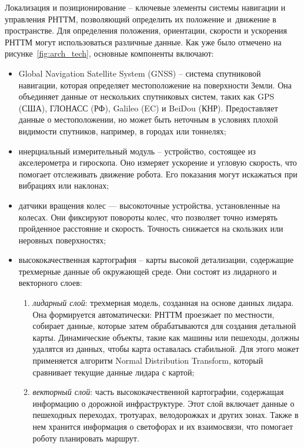 Локализация и позиционирование -- ключевые элементы системы навигации и управления РНТТМ, позволяющий определить их положение и~движение в пространстве. Для определения положения, ориентации, скорости и ускорения РНТТМ могут использоваться различные данные. Как уже было отмечено на рисунке~\cref{fig:arch_tech}, основные компоненты включают:

\begin{itemize}[beginpenalty=10000, midpenalty=10000, wide=\parindent, leftmargin=0pt]
	\item Global Navigation Satellite System (GNSS)	-- система спутниковой навигации, которая определяет местоположение на поверхности Земли. Она объединяет данные от нескольких спутниковых систем, таких как GPS (США), ГЛОНАСС (РФ), Galileo (EC) и BeiDou (КНР). Предоставляет данные о местоположении, но может быть неточным в условиях плохой видимости спутников, например, в городах или тоннелях;


 	\item инерциальный измерительный модуль -- устройство, состоящее из акселерометра и гироскопа. Оно измеряет ускорение и угловую скорость, что помогает отслеживать движение робота. Его показания могут искажаться при вибрациях или наклонах;

	\item датчики вращения колес — высокоточные устройства, установленные на колесах. Они фиксируют повороты колес, что позволяет точно измерять пройденное расстояние и скорость. Точность снижается на скользких или неровных поверхностях;

	\item высококачественная картография -- карты высокой детализации, содержащие трехмерные данные об окружающей среде. Они состоят из лидарного и векторного слоев:

	\begin{enumerate}[beginpenalty=10000, midpenalty=10000, wide=\parindent, leftmargin=0pt]
		\item \textit{лидарный слой}:
		трехмерная модель, созданная на основе данных лидара. Она формируется автоматически: РНТТМ проезжает по местности, собирает данные, которые затем обрабатываются для создания детальной карты. Динамические объекты, такие как машины или пешеходы, должны удалятся из данных, чтобы карта оставалась стабильной. Для этого может применяется алгоритм Normal Distribution Transform, который сравнивает текущие данные лидара с картой;

		\item \textit{векторный слой}:
		часть высококачественной картографии, содержащая информацию о дорожной инфраструктуре. Этот слой включает данные о пешеходных переходах, тротуарах, велодорожках и других зонах. Также в нем хранится информация о светофорах и их взаимосвязи, что помогает роботу планировать маршрут.
	\end{enumerate}
\end{itemize}

